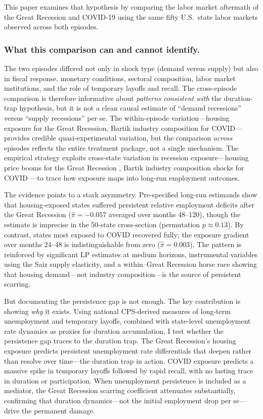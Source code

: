\documentclass[12pt]{article}
\begin{document}
This paper examines that hypothesis by comparing the labor market aftermath of the Great Recession and COVID-19 using the same fifty U.S.\ state labor markets observed across both episodes.

\subsubsection*{What this comparison can and cannot identify.} The two episodes differed not only in shock type (demand versus supply) but also in fiscal response, monetary conditions, sectoral composition, labor market institutions, and the role of temporary layoffs and recall. The cross-episode comparison is therefore informative about \textit{patterns consistent with} the duration-trap hypothesis, but it is not a clean causal estimate of ``demand recessions'' versus ``supply recessions'' per se. The within-episode variation---housing exposure for the Great Recession, Bartik industry composition for COVID---provides credible quasi-experimental variation, but the comparison \textit{across} episodes reflects the entire treatment package, not a single mechanism. The empirical strategy exploits cross-state variation in recession exposure---housing price booms for the Great Recession \citep{mian2014explains}, Bartik industry composition shocks for COVID \citep{goldsmith2020bartik}---to trace how exposure maps into long-run employment outcomes.

The evidence points to a stark asymmetry. Pre-specified long-run estimands show that housing-exposed states suffered persistent relative employment deficits after the Great Recession ($\hat{\pi} = -0.057$ averaged over months 48--120), though the estimate is imprecise in the 50-state cross-section (permutation $p \approx 0.13$). By contrast, states most exposed to COVID recovered fully; the exposure gradient over months 24--48 is indistinguishable from zero ($\hat{\pi} = 0.003$). The pattern is reinforced by significant LP estimates at medium horizons, instrumental variables using the Saiz supply elasticity, and a within--Great Recession horse race showing that housing demand---not industry composition---is the source of persistent scarring.

But documenting the persistence gap is not enough. The key contribution is showing \textit{why} it exists. Using national CPS-derived measures of long-term unemployment and temporary layoffs, combined with state-level unemployment rate dynamics as proxies for duration accumulation, I test whether the persistence gap traces to the duration trap. The Great Recession's housing exposure predicts persistent unemployment rate differentials that deepen rather than resolve over time---the duration trap in action. COVID exposure predicts a massive spike in temporary layoffs followed by rapid recall, with no lasting trace in duration or participation. When unemployment persistence is included as a mediator, the Great Recession scarring coefficient attenuates substantially, confirming that duration dynamics---not the initial employment drop per se---drive the permanent damage.
\end{document}
